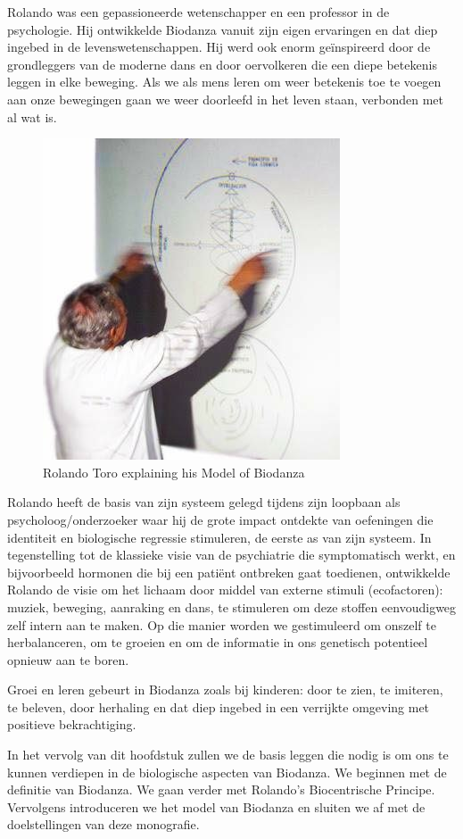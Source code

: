 \documentclass[
  11pt,
]{book}
\begin{document}
Rolando was een gepassioneerde wetenschapper en een professor in de psychologie. Hij ontwikkelde Biodanza vanuit zijn eigen ervaringen en dat diep ingebed in de levenswetenschappen. Hij werd ook enorm geïnspireerd door de grondleggers van de moderne dans en door oervolkeren die een diepe betekenis leggen in elke beweging. Als we als mens leren om weer betekenis toe te voegen aan onze bewegingen gaan we weer doorleefd in het leven staan, verbonden met al wat is.

\begin{figure}

{\centering \includegraphics[width=0.45\linewidth]{./figs/rolandoAndModel} 

}

\caption{Rolando Toro explaining his Model of Biodanza}\label{fig:rolandoModel}
\end{figure}

Rolando heeft de basis van zijn systeem gelegd tijdens zijn loopbaan als psycholoog/onderzoeker waar hij de grote impact ontdekte van oefeningen die identiteit en biologische regressie stimuleren, de eerste as van zijn systeem. In tegenstelling tot de klassieke visie van de psychiatrie die symptomatisch werkt, en bijvoorbeeld hormonen die bij een patiënt ontbreken gaat toedienen, ontwikkelde Rolando de visie om het lichaam door middel van externe stimuli (ecofactoren): muziek, beweging, aanraking en dans, te stimuleren om deze stoffen eenvoudigweg zelf intern aan te maken. Op die manier worden we gestimuleerd om onszelf te herbalanceren, om te groeien en om de informatie in ons genetisch potentieel opnieuw aan te boren.

Groei en leren gebeurt in Biodanza zoals bij kinderen: door te zien, te imiteren, te beleven, door herhaling en dat diep ingebed in een verrijkte omgeving met positieve bekrachtiging.

In het vervolg van dit hoofdstuk zullen we de basis leggen die nodig is om ons te kunnen verdiepen in de biologische aspecten van Biodanza. We beginnen met de definitie van Biodanza. We gaan verder met Rolando's Biocentrische Principe. Vervolgens introduceren we het model van Biodanza en sluiten we af met de doelstellingen van deze monografie.
\end{document}

